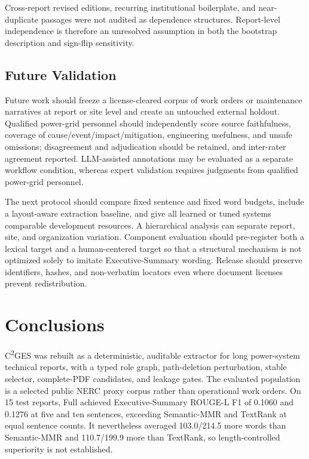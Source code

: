 \documentclass[applsci,article,submit,moreauthors]{Definitions/mdpi}
\newcommand{\cges}{C\textsuperscript{2}GES}
\begin{document}
Cross-report revised editions, recurring institutional boilerplate, and near-duplicate passages were not audited as dependence structures. Report-level independence is therefore an unresolved assumption in both the bootstrap description and sign-flip sensitivity.

\subsection{Future Validation}

Future work should freeze a license-cleared corpus of work orders or maintenance narratives at report or site level and create an untouched external holdout. Qualified power-grid personnel should independently score source faithfulness, coverage of cause/event/impact/mitigation, engineering usefulness, and unsafe omissions; disagreement and adjudication should be retained, and inter-rater agreement reported. LLM-assisted annotations may be evaluated as a separate workflow condition, whereas expert validation requires judgments from qualified power-grid personnel.

The next protocol should compare fixed sentence and fixed word budgets, include a layout-aware extraction baseline, and give all learned or tuned systems comparable development resources. A hierarchical analysis can separate report, site, and organization variation. Component evaluation should pre-register both a lexical target and a human-centered target so that a structural mechanism is not optimized solely to imitate Executive-Summary wording. Release should preserve identifiers, hashes, and non-verbatim locators even where document licenses prevent redistribution.

\section{Conclusions}

\cges{} was rebuilt as a deterministic, auditable extractor for long power-system technical reports, with a typed role graph, path-deletion perturbation, stable selector, complete-PDF candidates, and leakage gates. The evaluated population is a selected public NERC proxy corpus rather than operational work orders. On 15 test reports, Full achieved Executive-Summary ROUGE-L F1 of 0.1060 and 0.1276 at five and ten sentences, exceeding Semantic-MMR and TextRank at equal sentence counts. It nevertheless averaged 103.0/214.5 more words than Semantic-MMR and 110.7/199.9 more than TextRank, so length-controlled superiority is not established.
\end{document}
